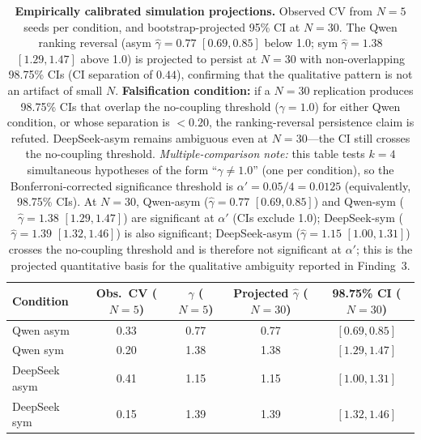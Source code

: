 \documentclass[11pt]{article}
\begin{document}
\begin{table}[h]
\centering
\caption{\textbf{Empirically calibrated simulation projections.} Observed CV from $N{=}5$ seeds per condition, and bootstrap-projected 95\% CI at $N{=}30$. The Qwen ranking reversal (asym $\hat{\gamma}{=}0.77$ $[0.69, 0.85]$ below 1.0; sym $\hat{\gamma}{=}1.38$ $[1.29, 1.47]$ above 1.0) is projected to persist at $N{=}30$ with non-overlapping 98.75\% CIs (CI separation of $0.44$), confirming that the qualitative pattern is not an artifact of small $N$. \textbf{Falsification condition:} if a $N{=}30$ replication produces 98.75\% CIs that overlap the no-coupling threshold ($\gamma{=}1.0$) for either Qwen condition, or whose separation is $< 0.20$, the ranking-reversal persistence claim is refuted. DeepSeek-asym remains ambiguous even at $N{=}30$---the CI still crosses the no-coupling threshold. \emph{Multiple-comparison note:} this table tests $k{=}4$ simultaneous hypotheses of the form ``$\gamma \neq 1.0$'' (one per condition), so the Bonferroni-corrected significance threshold is $\alpha' = 0.05/4 = 0.0125$ (equivalently, 98.75\% CIs). At $N{=}30$, Qwen-asym ($\hat{\gamma}{=}0.77$ $[0.69, 0.85]$) and Qwen-sym ($\hat{\gamma}{=}1.38$ $[1.29, 1.47]$) are significant at $\alpha'$ (CIs exclude 1.0); DeepSeek-sym ($\hat{\gamma}{=}1.39$ $[1.32, 1.46]$) is also significant; DeepSeek-asym ($\hat{\gamma}{=}1.15$ $[1.00, 1.31]$) crosses the no-coupling threshold and is therefore not significant at $\alpha'$; this is the projected quantitative basis for the qualitative ambiguity reported in Finding~3.}
\label{tab:calibration}
\begin{tabular}{@{}lcccc@{}}
\toprule
Condition & Obs.\ CV ($N{=}5$) & $\hat{\gamma}$ ($N{=}5$) & Projected $\hat{\gamma}$ ($N{=}30$) & 98.75\% CI ($N{=}30$) \\
\midrule
Qwen asym      & 0.33 & 0.77 & 0.77 & $[0.69, 0.85]$ \\
Qwen sym       & 0.20 & 1.38 & 1.38 & $[1.29, 1.47]$ \\
DeepSeek asym  & 0.41 & 1.15 & 1.15 & $[1.00, 1.31]$ \\
DeepSeek sym   & 0.15 & 1.39 & 1.39 & $[1.32, 1.46]$ \\
\bottomrule
\end{tabular}
\end{table}
\end{document}
